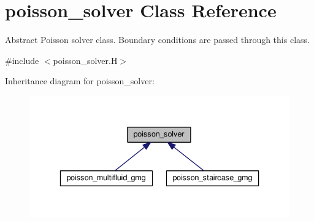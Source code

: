 \hypertarget{classpoisson__solver}{}\section{poisson\+\_\+solver Class Reference}
\label{classpoisson__solver}


Abstract Poisson solver class. Boundary conditions are passed through this class.  




{\ttfamily \#include $<$poisson\+\_\+solver.\+H$>$}



Inheritance diagram for poisson\+\_\+solver\+:\nopagebreak
\begin{figure}[H]
\begin{center}
\leavevmode
\includegraphics[width=336pt]{classpoisson__solver__inherit__graph}
\end{center}
\end{figure}
